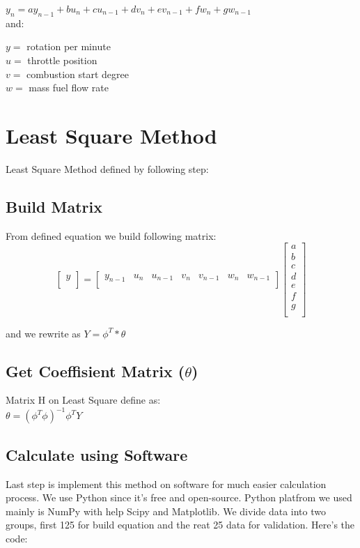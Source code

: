\documentclass{article}
\begin{document}
\hspace{10pt} $y_n = ay_{n-1} + bu_n + cu_{n-1} + dv_n + ev_{n-1} + fw_n + gw_{n-1}$\\

and:

\noindent$y =$ rotation per minute\\
$u =$ throttle position\\
$v =$ combustion start degree\\
$w =$ mass fuel flow rate

\newpage

\section{Least Square Method}

Least Square Method defined by following step:

\subsection{Build Matrix}
From defined equation we build following matrix:
\[
\begin{bmatrix}
    y \\
\end{bmatrix}
=
\begin{bmatrix}
	y_{n-1} & u_n & u_{n-1} & v_n & v_{n-1} & w_n & w_{n-1} \\
\end{bmatrix}
\begin{bmatrix}
    a \\
    b \\
    c \\
    d \\
    e \\
    f \\
    g \\
\end{bmatrix}
\]

and we rewrite as $Y = \phi^T * \theta$

\subsection{Get Coeffisient Matrix ($\theta$)}
Matrix H on Least Square define as:\\

$\theta = (\phi^T\phi)^{-1}\phi^TY $ 

\subsection{Calculate using Software}
Last step is implement this method on software for much easier calculation process.
We use Python since it's free and open-source.
Python platfrom we used mainly is NumPy with help Scipy and Matplotlib.
We divide data into two groups, first 125 for build equation and the reat 25 data for validation.
Here's the code:\\
\inputminted{python}{least_square.py}
\end{document}
